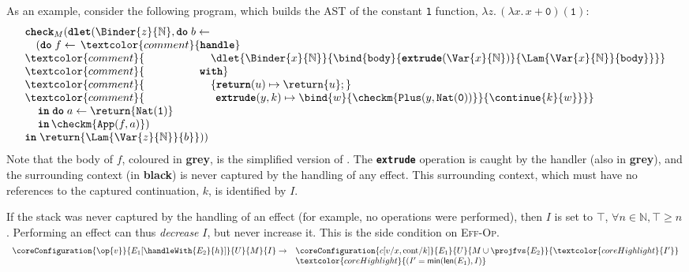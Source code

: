 As an example, consider the following program, which builds the AST of the constant \texttt{1} function, $\lambda z. \, (\lambda x. \, x + \texttt{0}) (\texttt{1})$:
\[\begin{array}{l}
  \textbf{\texttt{check}}_M(\textbf{\texttt{dlet}}(\Binder{z}{\mathbb{N}}, \textbf{\texttt{do}} \; b \leftarrow \, \\ 
  \quad (\textbf{\texttt{do}} \; f \leftarrow \, \textcolor{comment}{\textbf{\texttt{handle}}} \\
  \textcolor{comment}{\;\;\;\,\quad \quad \quad\quad\quad {\dlet{\Binder{x}{\mathbb{N}}}{
  \bind{\texttt{body}}{\textbf{\texttt{extrude}}(\Var{x}{\mathbb{N}})}{\Lam{\Var{x}{\mathbb{N}}}{\texttt{body}}}}}} \\ 
  \textcolor{comment}{\;\;\;\,\quad \quad\quad\quad \textbf{\texttt{with}}} \\ 
  \textcolor{comment}{\;\;\;\,\quad \quad\quad\quad \quad \{ \textbf{\texttt{return}}(u) \mapsto {\return{u}};} \\ 
  \textcolor{comment}{\;\;\;\, \quad \quad\quad\quad \quad \;\, \textbf{\texttt{extrude}}(y, k) \mapsto {\bind{w}{\checkm{\texttt{Plus}(y, \texttt{Nat}(\texttt{0}))}}{\continue{k}{w}}}\}} \\ 
  \, \quad \textbf{\texttt{in}} \; \textbf{\texttt{do}} \; {a}\leftarrow {\return{\texttt{Nat}(\texttt{1})}}\\
  \, \quad \textbf{\texttt{in}} \, {\checkm{\texttt{App}(f, a)}})\; \\
  \textbf{\texttt{in}} \; \return{\Lam{\Var{z}{\mathbb{N}}}{b}})) 
\end{array}\]
Note that the body of $f$, coloured in \textbf{\textcolor{comment}{grey}}, is the simplified version of . The \textbf{\texttt{extrude}} operation is caught by the handler (also in \textbf{\textcolor{comment}{grey}}), and the surrounding context (in \textbf{black}) is never captured by the handling of any effect. This surrounding context, which must have no references to the captured continuation, $k$, is identified by $I$.

If the stack was never captured by the handling of an effect (for example, no operations were performed), then $I$ is set to $\top$, $\forall n \in \mathbb{N}, \top \geq n$. Performing an effect can thus \textit{decrease} $I$, but never increase it. This is the side condition on \textsc{Eff-Op}.
\[\begin{array}{ll}\coreConfiguration{\op{v}}{E_1[\handleWith{E_2}{h}]}{U}{M}{I} \to & \coreConfiguration{c[v/x, \text{cont}/ k]}{E_1}{U}{{M \cup \projfvs{E_2}}}{\textcolor{coreHighlight}{I'}} \\ &\textcolor{coreHighlight}{(I' = \textsf{min}(\textsf{len}(E_1), I)} \end{array}\]

